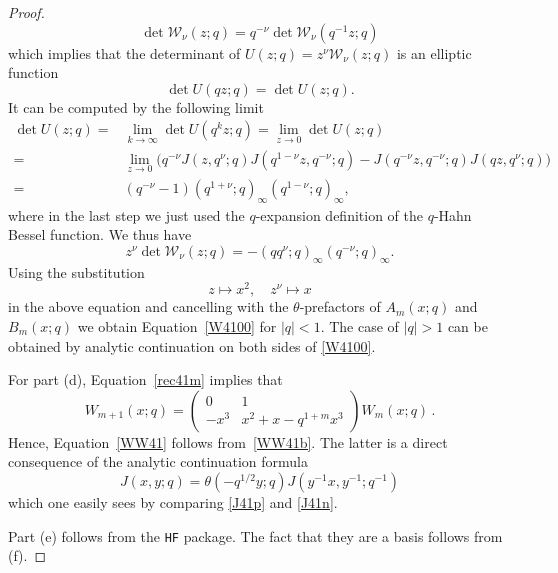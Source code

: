 \documentclass[12pt,reqno]{amsart}
\theoremstyle{definition}
\def\-{\,-\,}
\def\cW{\mathcal{W}}
\newcommand{\nn}{\nonumber \\}
\begin{document}
\begin{proof}
\begin{equation}
    \det\cW_\nu(z;q) = q^{-\nu} \det\cW_\nu(q^{-1}z;q)
  \end{equation}
  which implies that the determinant of $U(z;q) = z^\nu \cW_\nu(z;q)$ is
  an elliptic function
  \begin{equation}
    \det U(qz;q) = \det U(z;q).
  \end{equation}
  It can be computed by the following limit
  \begin{align}
    \det U(z;q) =
    &\lim_{k\rightarrow \infty} \det U(q^k z;q) = \lim_{z\rightarrow 0}
      \det U(z;q)\nn  =
    &\lim_{z\rightarrow 0} \Big(
      q^{-\nu}J(z,q^\nu;q)J(q^{1-\nu}z,q^{-\nu};q) -
      J(q^{-\nu}z,q^{-\nu};q)J(qz,q^\nu;q)
      \Big) \nn =
    &(q^{-\nu}-1)(q^{1+\nu};q)_\infty(q^{1-\nu};q)_\infty,
  \end{align}
  where in the last step we just used the $q$-expansion definition of
  the $q$-Hahn Bessel function.  We thus have
  \begin{equation}
    \label{zcw}
    z^\nu \det \cW_\nu(z;q) = -(q q^\nu;q)_\infty(q^{-\nu};q)_\infty.
  \end{equation}
  Using the substitution
  \begin{equation}
    z\mapsto x^2,\quad z^\nu \mapsto x
  \end{equation}
  in the above equation and cancelling with the
  $\theta$-prefactors of $A_m(x;q)$ and $B_m(x;q)$ we
  obtain Equation~\eqref{W4100} for $|q|<1$.
  The case of $|q|>1$ can be obtained by analytic continuation on both
  sides of \eqref{W4100}.

  For part (d), Equation~\eqref{rec41m} implies that
  \begin{equation}
    W_{m+1}(x;q) =
    \begin{pmatrix}
      0&1\\-x^3&x^2+x-q^{1+m}x^3
    \end{pmatrix} W_m(x;q) \,.
    \label{eq:W41rec}
  \end{equation}
  Hence, Equation~\eqref{WW41} follows from~\eqref{WW41b}. The
  latter is a direct consequence of the analytic continuation formula
  \begin{equation}
    J(x,y;q) = \theta(-q^{1/2}y;q)J(y^{-1}x,y^{-1};q^{-1})
  \end{equation}
  which one easily sees by comparing \eqref{J41p} and \eqref{J41n}.

  Part (e) follows from the \texttt{HF} package. The
  fact that they are a basis follows from (f).


\end{proof}
\end{document}
